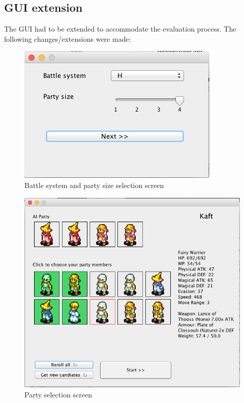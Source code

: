 \subsection{GUI extension}
\label{sub:guiextension}

The GUI had to be extended to accommodate the evaluation process. The following changes/extensions were made:

\begin{figure}
	\centering
	\includegraphics[width=.36\linewidth]{figures/gui_first}
	\caption{Battle system and party size selection screen}
	\label{fig:gui1}
\end{figure}

\begin{figure}
	\centering
	\includegraphics[width=.62\linewidth]{figures/gui_selector}
	\caption{Party selection screen}
	\label{fig:gui2}
\end{figure}

